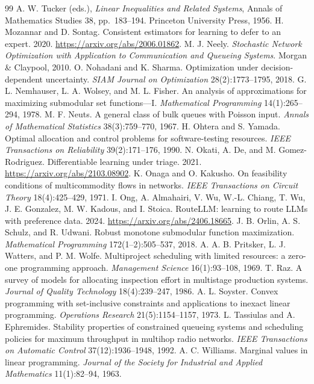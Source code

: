 \documentclass[11pt]{article}
\theoremstyle{definition}
\theoremstyle{remark}
\begin{document}
\begin{thebibliography}{99}
A. W. Tucker (eds.), \emph{Linear Inequalities and Related Systems}, Annals of Mathematics Studies 38,
pp.~183--194. Princeton University Press, 1956.
 H. Mozannar and D. Sontag. Consistent estimators for learning to defer to an
expert. 2020. \url{https://arxiv.org/abs/2006.01862}.
 M. J. Neely. \emph{Stochastic Network Optimization with Application to
Communication and Queueing Systems}. Morgan \& Claypool, 2010.
 O. Nohadani and K. Sharma. Optimization under decision-dependent uncertainty.
\emph{SIAM Journal on Optimization} 28(2):1773--1795, 2018.
 G. L. Nemhauser, L. A. Wolsey, and M. L. Fisher. An analysis of approximations for
maximizing submodular set functions---I. \emph{Mathematical Programming} 14(1):265--294, 1978.
 M. F. Neuts. A general class of bulk queues with Poisson input. \emph{Annals of
Mathematical Statistics} 38(3):759--770, 1967.
 H. Ohtera and S. Yamada. Optimal allocation and control problems for
software-testing resources. \emph{IEEE Transactions on Reliability} 39(2):171--176, 1990.
 N. Okati, A. De, and M. Gomez-Rodriguez. Differentiable learning under triage.
2021. \url{https://arxiv.org/abs/2103.08902}.
 K. Onaga and O. Kakusho. On feasibility conditions of multicommodity flows in
networks. \emph{IEEE Transactions on Circuit Theory} 18(4):425--429, 1971.
 I. Ong, A. Almahairi, V. Wu, W.-L. Chiang, T. Wu, J. E. Gonzalez, M. W. Kadous, and
I. Stoica. RouteLLM: learning to route LLMs with preference data. 2024.
\url{https://arxiv.org/abs/2406.18665}.
 J. B. Orlin, A. S. Schulz, and R. Udwani. Robust monotone submodular function
maximization. \emph{Mathematical Programming} 172(1--2):505--537, 2018.
 A. A. B. Pritsker, L. J. Watters, and P. M. Wolfe. Multiproject scheduling with
limited resources: a zero-one programming approach. \emph{Management Science} 16(1):93--108, 1969.
 T. Raz. A survey of models for allocating inspection effort in multistage production
systems. \emph{Journal of Quality Technology} 18(4):239--247, 1986.
 A. L. Soyster. Convex programming with set-inclusive constraints and applications
to inexact linear programming. \emph{Operations Research} 21(5):1154--1157, 1973.
 L. Tassiulas and A. Ephremides. Stability properties of constrained queueing
systems and scheduling policies for maximum throughput in multihop radio networks. \emph{IEEE
Transactions on Automatic Control} 37(12):1936--1948, 1992.
 A. C. Williams. Marginal values in linear programming. \emph{Journal of the
Society for Industrial and Applied Mathematics} 11(1):82--94, 1963.
\end{thebibliography}
\end{document}
